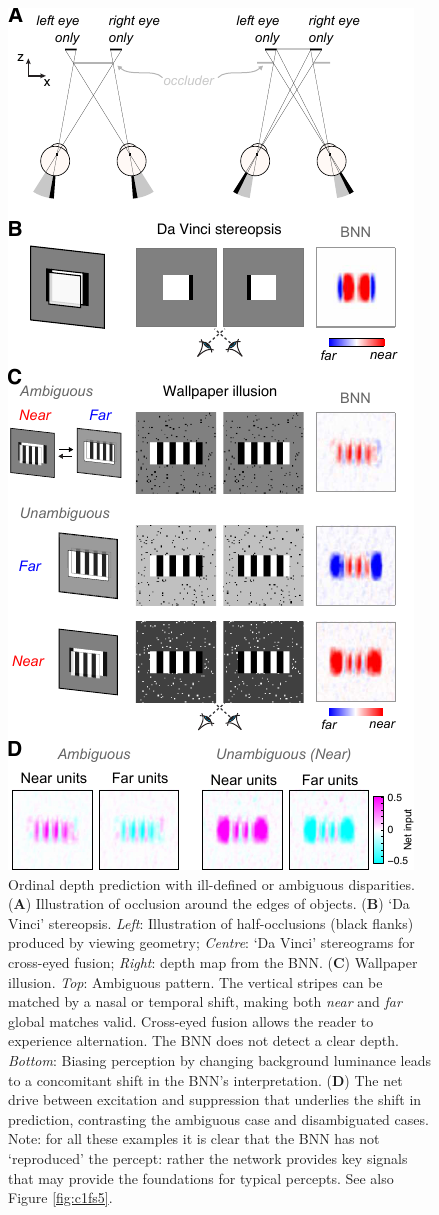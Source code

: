 {\begin{figure}[!h]
  \centering
  \includegraphics{chapter1/chapter1-figs/Fig6.pdf}
  \caption[Ordinal depth prediction with ill-defined or ambiguous disparities.]{Ordinal depth prediction with ill-defined or ambiguous disparities. ({\bf A}) Illustration of occlusion around the edges of objects. ({\bf B}) `Da Vinci' stereopsis. {\it Left}: Illustration of half-occlusions (black flanks) produced by viewing geometry; {\it Centre}: `Da Vinci' stereograms for cross-eyed fusion; {\it Right}: depth map from the BNN. ({\bf C}) Wallpaper illusion. {\it Top}: Ambiguous pattern. The vertical stripes can be matched by a nasal or temporal shift, making both {\it near} and {\it far} global matches valid. Cross-eyed fusion allows the reader to experience alternation. The BNN does not detect a clear depth. {\it Bottom}: Biasing perception by changing background luminance leads to a concomitant shift in the BNN's interpretation. ({\bf D}) The net drive between excitation and suppression that underlies the shift in prediction, contrasting the ambiguous case and disambiguated cases. Note: for all these examples it is clear that the BNN has not `reproduced' the percept: rather the network provides key signals that may provide the foundations for typical percepts. See also Figure \ref{fig:c1fs5}. }

\end{figure}}
